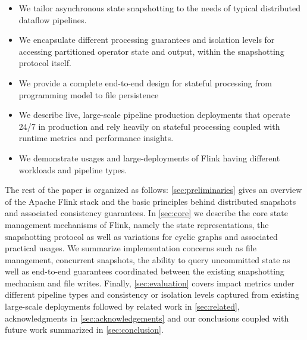\begin{itemize}
	\item We tailor asynchronous state snapshotting to the needs of typical distributed dataflow pipelines.
	\item We encapsulate different processing guarantees and isolation levels for accessing partitioned operator state and output, within the snapshotting protocol itself.
	\item We provide a complete end-to-end design for stateful processing from programming model to file persistence
	\item We describe live, large-scale pipeline production deployments that operate 24/7 in production and rely heavily on stateful processing coupled with runtime metrics and performance insights.
	\item We demonstrate usages and large-deployments of Flink having different workloads and pipeline types.
\end{itemize}

The rest of the paper is organized as follows: \autoref{sec:preliminaries} gives an overview of the Apache Flink stack and the basic principles behind distributed snapshots and associated consistency guarantees. In \autoref{sec:core} we describe the core state management mechanisms of Flink, namely the state representations, the snapshotting protocol as well as variations for cyclic graphs and associated practical usages. We summarize implementation concerns such as file management, concurrent snapshots, the ability to query uncommitted state as well as end-to-end guarantees coordinated between the existing snapshotting mechanism and file writes. Finally, \autoref{sec:evaluation} covers impact metrics under different pipeline types and consistency or isolation levels captured from existing large-scale deployments followed by related work in \autoref{sec:related}, acknowledgments in \autoref{sec:acknowledgements} and our conclusions coupled with future work summarized in \autoref{sec:conclusion}.
